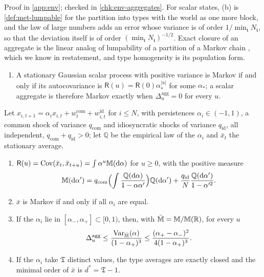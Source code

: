 Proof in \cref{app:env}; checked in \cref{chk:env-aggregates}. For scalar states, (b) is \cref{def:met-lumpable} for the partition into types with the world as one more block, and the law of large numbers adds an error whose variance is of order $1/\min_{\mathfrak t}N_{\mathfrak t}$, so that the deviation itself is of order $(\min_{\mathfrak t}N_{\mathfrak t})^{-1/2}$. Exact closure of an aggregate is the linear analog of lumpability of a partition of a Markov chain \citep{kemeny1960finite}, which we know in restatement, and type homogeneity is its population form.

\begin{proposition}\label{prop:env-aggregate-memory}
\begin{enumerate}
\item[(a)] A stationary Gaussian scalar process with positive variance is Markov if and only if its autocovariance is $\mathsf R(u)=\mathsf R(0)\alpha_\ast^{\lvert u\rvert}$ for some $\alpha_\ast$; a scalar aggregate is therefore Markov exactly when $\Delta^{\mathrm{agg}}_u=0$ for every $u$.
\end{enumerate}
Let $x_{i,t+1}=\alpha_ix_{i,t}+w^{\mathrm{com}}_t+w^{\mathrm{id}}_{i,t}$ for $i\le N$, with persistences $\alpha_i\in(-1,1)$, a common shock of variance $q_{\mathrm{com}}$ and idiosyncratic shocks of variance $q_{\mathrm{id}}$, all independent, $q_{\mathrm{com}}+q_{\mathrm{id}}>0$; let $\mathbb Q$ be the empirical law of the $\alpha_i$ and $\bar x_t$ the stationary average.
\begin{enumerate}
\item[(b)] $\mathsf R(u)=\operatorname{Cov}(\bar x_t,\bar x_{t+u})=\int\alpha^u\mathbb M(\mathrm d\alpha)$ for $u\ge0$, with the positive measure
\[
\mathbb M(\mathrm d\alpha')=q_{\mathrm{com}}\Bigl(\int\frac{\mathbb Q(\mathrm d\alpha)}{1-\alpha\alpha'}\Bigr)\mathbb Q(\mathrm d\alpha')+\frac{q_{\mathrm{id}}}{N}\frac{\mathbb Q(\mathrm d\alpha')}{1-\alpha'^2}.
\]
\item[(c)] $\bar x$ is Markov if and only if all $\alpha_i$ are equal.
\item[(d)] If the $\alpha_i$ lie in $[\alpha_-,\alpha_+]\subset[0,1)$, then, with $\bar{\mathbb M}=\mathbb M/\mathbb M(\mathbb{R})$, for every $u$
\[
\Delta^{\mathrm{agg}}_u\le\frac{\operatorname{Var}_{\bar{\mathbb M}}(\alpha)}{(1-\alpha_+)^3}\le\frac{(\alpha_+-\alpha_-)^2}{4(1-\alpha_+)^3}.
\]
\item[(e)] If the $\alpha_i$ take $\mathfrak T$ distinct values, the type averages are exactly closed and the minimal order of $\bar x$ is $d^\ast=\mathfrak T-1$.

\end{enumerate}
\end{proposition}
